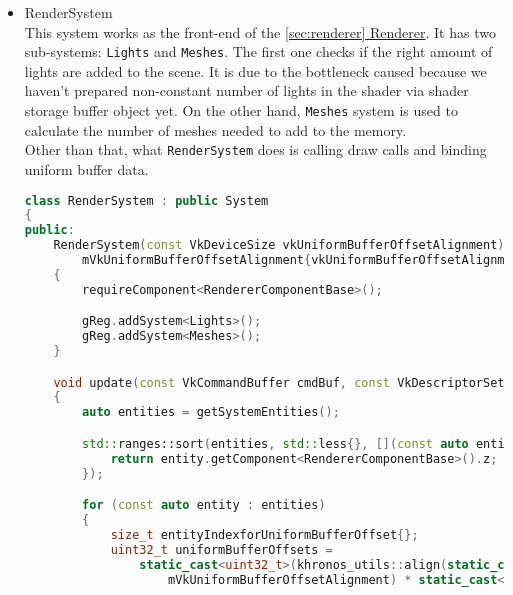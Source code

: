 \begin{itemize}
\begin{itemize}
\begin{lstlisting}[language=c++, caption=Movement code without Cyberith (./engine/src/ecs/systems/movement\_system.hpp)]
                if ((!controllerPose.isNan()) || (controllerPose == math::Vec3{0.f}))
                {
                    const math::Vec3 forward{controllers.getPose(controllerIndex)[2]};
                    player.getComponent<TransformComponent>().pos += forward * player.getComponent<RigidBodyComponent>().velocity * dt;
                }
                else
                {
                    TS_WARN(std::format("Controller no. {} can not be located.", controllerIndex).c_str());
                }
            }
        }
\end{lstlisting}
    \end{itemize}
    \item RenderSystem\\
    \label{sec:renderer_system}
    This system works as the front-end of the \hyperref[sec:renderer]{\ref*{sec:renderer} Renderer}.
    It has two sub-systems: \texttt{Lights} and \texttt{Meshes}. The first one checks if the right amount of lights are added to the scene. It is due to the bottleneck caused because we haven't prepared non-constant number of lights in the shader via shader storage buffer object yet. On the other hand, \texttt{Meshes} system is used to calculate the number of meshes needed to add to the memory.\\
    Other than that, what \texttt{RenderSystem} does is calling draw calls and binding uniform buffer data.
\begin{lstlisting}[language=c++, caption=Front-end of the rendrer (./engine/src/ecs/systems/render\_system.hpp)]
class RenderSystem : public System
{
public:
    RenderSystem(const VkDeviceSize vkUniformBufferOffsetAlignment) :
        mVkUniformBufferOffsetAlignment{vkUniformBufferOffsetAlignment}
    {
        requireComponent<RendererComponentBase>();

        gReg.addSystem<Lights>();
        gReg.addSystem<Meshes>();
    }

    void update(const VkCommandBuffer cmdBuf, const VkDescriptorSet descriptorSet)
    {
        auto entities = getSystemEntities();

        std::ranges::sort(entities, std::less{}, [](const auto entity) {
            return entity.getComponent<RendererComponentBase>().z;
        });

        for (const auto entity : entities)
        {
            size_t entityIndexforUniformBufferOffset{};
            uint32_t uniformBufferOffsets = 
                static_cast<uint32_t>(khronos_utils::align(static_cast<VkDeviceSize>(sizeof(decltype(RenderProcess::mIndividualUniformData)::value_type)),
                    mVkUniformBufferOffsetAlignment) * static_cast<VkDeviceSize>(entityIndexforUniformBufferOffset));


\end{lstlisting}
\end{itemize}
